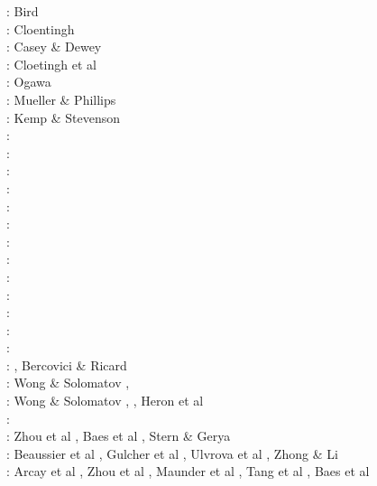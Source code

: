 \begin{scriptsize}
\nineteenseventyeight: Bird \cite{bird78}\\
\nineteeneightytwo: Cloentingh \cite{clwv82}\\
\nineteeneightyfour: Casey \& Dewey \cite{cade84}\\
\nineteeneightynine: Cloetingh et al \cite{clwv89}\\
\nineteenninety: Ogawa \cite{ogaw90} \\
\nineteenninetyone: Mueller \& Phillips \cite{muph91}\\
\nineteenninetysix: Kemp \& Stevenson \cite{kest96}\\
\nineteenninetyeight: \cite{togu98}\\
\nineteenninetynine: \cite{fagd99}\\
\twothousand: \cite{pybf00}\\
\twothousandone: \cite{dohe01}\cite{reyb01}\cite{brry01}\\
\twothousandfour: \cite{ster04}\cite{guhl04}\cite{solo04}\\
\twothousandthree: \cite{hags03}\\
\twothousandfive: \cite{bihi05}\\
\twothousandseven: \cite{kore07}\\
\twothousandeight: \cite{uegs08}\\
\twothousandten: \cite{nigm10}\cite{bucl10}\\
\twothousandeleven: \cite{bagw11}\cite{nigm11}\cite{legu11}\\
\twothousandtwelve: \cite{stri12}\cite{thka12}\cite{lega12}\cite{shch12}\\
\twothousandthirteen: \cite{dyge13}\cite{mana13}\cite{kore13}\cite{mibg13}\\
\twothousandfourteen: \cite{recf14}\cite{macg14}\cite{crta14}, Bercovici \& Ricard \cite{beri14}\\
\twothousandfifteen: Wong \& Solomatov \cite{woso15}, \cite{matv15}
                     \cite{pebu15}\cite{vapm15}\cite{legu15}\cite{gesb15}\\
\twothousandsixteen: Wong \& Solomatov \cite{woso16a}, \cite{crta16}\cite{maka16}\cite{bags16}, Heron et al \cite{heps16}\\
\twothousandseventeen: \cite{magm17}\\
\twothousandeighteen: Zhou et al \cite{zhlg18}, Baes et al \cite{basq18}, Stern \& Gerya \cite{stge18} \\
\twothousandnineteen: Beaussier et al \cite{begb19}, Gulcher et al \cite{gubg19}, 
Ulvrova et al \cite{ulcw19}, Zhong \& Li \cite{zhli19}\\
\twothousandtwenty: Arcay et al \cite{arla20}, Zhou et al \cite{zhlg20}, Maunder et al \cite{mapg20}, 
Tang et al \cite{tawm20}, Baes et al \cite{basg20b}
\end{scriptsize}


